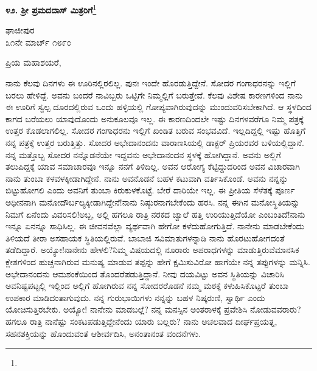 \begin{center}
\textbf{೪೨. ಶ‍್ರೀ ಪ್ರಮದದಾಸ್ ಮಿತ್ರರಿಗೆ}\footnote{}
\end{center}

\vspace{-0.5cm}

\begin{flushright}
ಘಾಜೀಪುರ\\೩೧ನೇ ಮಾರ್ಚ್ ೧೮೯೦
\end{flushright}

\noindent
ಪ್ರಿಯ ಮಹಾಶಯರೆ,

ನಾನು ಕೆಲವು ದಿನಗಳು ಈ ಊರಿನಲ್ಲಿರಲಿಲ್ಲ. ಪುನಃ ಇಂದೇ ಹೊರಡುತ್ತಿದ್ದೇನೆ. ಸೋದರ ಗಂಗಾಧರನನ್ನು ಇಲ್ಲಿಗೆ ಬರಲು ಹೇಳಿದ್ದೆ. ಅವನು ಬಂದರೆ ನಾವಿಬ್ಬರು ಒಟ್ಟಿಗೇ ನಿಮ್ಮಲ್ಲಿಗೆ ಬರುತ್ತೇವೆ. ಕೆಲವು ವಿಶೇಷ ಕಾರಣಗಳಿಂದ ನಾನು ಈ ಊರಿಗೆ ಸ್ವಲ್ಪ ದೂರದಲ್ಲಿರುವ ಒಂದು ಹಳ್ಳಿಯಲ್ಲಿ ಗೋಪ್ಯವಾಗಿರುವುದನ್ನು ಮುಂದುವರಿಸಬೇಕಾಗಿದೆ. ಆ ಸ್ಥಳದಿಂದ ಕಾಗದ ಬರೆಯಲು ಯಾವುದೊಂದು ಅನುಕೂಲವೂ ಇಲ್ಲ. ಈ ಕಾರಣದಿಂದಲೇ ಇಷ್ಟು ದಿನಗಳವರೆಗೂ ನಿಮ್ಮ ಪತ್ರಕ್ಕೆ ಉತ್ತರ ಕೊಡಲಾಗಲಿಲ್ಲ. ಸೋದರ ಗಂಗಾಧರನು ಇಲ್ಲಿಗೆ ಖಂಡಿತ ಬರುವ ಸಂಭವವಿದೆ. ಇಲ್ಲದಿದ್ದಲ್ಲಿ ಇಷ್ಟು ಹೊತ್ತಿಗೆ ನನ್ನ ಪತ್ರಕ್ಕೆ ಉತ್ತರ ಬರುತ್ತಿತ್ತು. ಸೋದರ ಅಭೇದಾನಂದನು ವಾರಾಣಸಿಯಲ್ಲಿ ಡಾಕ್ಟರ್ ಪ್ರಿಯರವರ ಬಳಿಯಲ್ಲಿದ್ದಾನೆ. ನನ್ನ ಮತ್ತೊಬ್ಬ ಸೋದರ ನನ್ನೊಡನೆಯೇ ಇದ್ದವನು ಅಭೇದಾನಂದನ ಸ್ಥಳಕ್ಕೆ ಹೋಗಿದ್ದಾನೆ. ಅವನು ಅಲ್ಲಿಗೆ ತಲುಪಿದ್ದಕ್ಕೆ ಯಾವ ಸಮಾಚಾರವೂ ಇನ್ನೂ ನನಗೆ ತಿಳಿದಿಲ್ಲ. ಅವನ ಆರೋಗ್ಯ ಕೆಟ್ಟಿದ್ದುದರಿಂದ ಅವನ ವಿಚಾರವಾಗಿ ನಾನು ತುಂಬಾ ಕಳವಳಕ್ಕೀಡಾಗಿದ್ದೇನೆ. ನಾನು ಅವನೊಡನೆ ಬಹಳ ಕಟುವಾಗಿ ವರ್ತಿಸಿಕೊಂಡೆ. ಅವನು ನನ್ನನ್ನು ಬಿಟ್ಟುಹೋಗಲಿ ಎಂದು ಅವನಿಗೆ ತುಂಬಾ ಕಿರುಕುಳಕೊಟ್ಟೆ. ಬೇರೆ ದಾರಿಯೇ ಇಲ್ಲ. ಈ ಪ್ರೀತಿಯ ಸೆಳೆತಕ್ಕೆ ಪೂರ್ಣ ಅಧೀನನಾಗಿ ಮನೋದೌರ್ಬಲ್ಯಕ್ಕೀಡಾಗಿದ್ದೇನೆ!ನಾನು ನಿಷ್ಠುರನಾಗಬೇಕೆಂದು ಹರಸಿ. ನನ್ನ ಈಗಿನ ಮನೋಸ್ಥಿತಿಯನ್ನು ನಿಮಗೆ ಏನೆಂದು ವಿವರಿಸಲಿ!ಅಬ್ಬ, ಅಲ್ಲಿ ಹಗಲೂ ರಾತ್ರಿ ನರಕದ ಜ್ವಾಲೆ ಹತ್ತಿ ಉರಿಯುತ್ತಿದೆಯೋ ಎಂಬಂತಿದೆ!ನಾನು ಇನ್ನೂ ಏನನ್ನೂ ಸಾಧಿಸಿಲ್ಲ. ಈ ಜೀವನವೆಲ್ಲಾ ವ್ಯರ್ಥವಾಗಿ ಹೇಗೋ ಕಳೆದುಹೋಗುತ್ತಿದೆ. ನಾನೇನು ಮಾಡಬೇಕೆಂದು ತಿಳಿಯದೆ ತೀರಾ ಅಸಹಾಯಕ ಸ್ಥಿತಿಯಲ್ಲಿರುವೆ. ಬಾಬಾಜಿ ಸವಿಮಾತುಗಳನ್ನಾಡಿ ನಾನು ಹೊರಟುಹೋಗದಂತೆ ತಡೆದಿದ್ದಾರೆ. ಅಯ್ಯೋ!ನಾನೇನು ಹೇಳಲಿ?ನಿಮ್ಮ ವಿಷಯದಲ್ಲಿ ನೂರಾರು ಅಪರಾಧಗಳನ್ನು ಮಾಡುತ್ತಿರುವೆ\enginline{-}ಮಾನಸಿಕ ಕ್ಲೇಶಗಳಿಂದ ಹುಚ್ಚನಾಗಿರುವ ಮನುಷ್ಯ ಮಾಡುವ ತಪ್ಪನ್ನು ಹೇಗೆ ಕ್ಷಮಿಸುವಿರೋ ಹಾಗೆಯೇ ನನ್ನ ತಪ್ಪುಗಳನ್ನು ಮನ್ನಿಸಿ. ಅಭೇದಾನಂದನು ಆಮಶಂಕೆಯಿಂದ ತೊಂದರೆಪಡುತ್ತಿದ್ದಾನೆ. ನೀವು ದಯವಿಟ್ಟು ಅವನ ಸ್ಥಿತಿಯನ್ನು ವಿಚಾರಿಸಿ ಅವನಿಷ್ಟಪಟ್ಟಲ್ಲಿ ಇಲ್ಲಿಂದ ಅಲ್ಲಿಗೆ ಹೋಗಿರುವ ನನ್ನ ಸೋದರರೊಡನೆ ನಮ್ಮ ಮಠಕ್ಕೆ ಕಳುಹಿಸಿಕೊಟ್ಟರೆ ತುಂಬಾ ಉಪಕಾರ ಮಾಡಿದಂತಾಗುವುದು. ನನ್ನ ಗುರುಭಾಯಿಗಳು ನನ್ನನ್ನು ಬಹಳ ನಿಷ್ಕರುಣಿ, ಸ್ವಾರ್ಥಿ ಎಂದು ಯೋಚಿಸುತ್ತಿರಬೇಕು. ಅಯ್ಯೋ! ನಾನೇನು ಮಾಡಬಲ್ಲೆ? ನನ್ನ ಮನಸ್ಸಿನ ಅಂತರಾಳಕ್ಕೆ ಪ್ರವೇಶಿಸಿ ನೋಡುವವರಾರು? ಹಗಲೂ ರಾತ್ರಿ ನಾನೆಷ್ಟು ಸಂಕಟಪಡುತ್ತಿದ್ದೇನೆಂದು ಯಾರು ಬಲ್ಲರು? ನಾನು ಅಚಲವಾದ ದೀರ್ಘಪ್ರಯತ್ನ, ಸಹನಶಕ್ತಿಯನ್ನು ಹೊಂದುವಂತೆ ಆಶೀರ್ವದಿಸಿ, ಅನಂತಾನಂತ ವಂದನೆಗಳು.

\vspace{-0.5cm}

